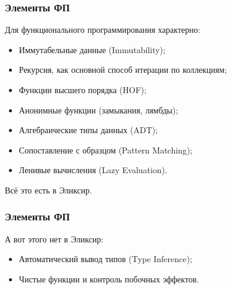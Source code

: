 \documentclass[10pt]{beamer}
\begin{document}
\begin{frame}
  \frametitle{Элементы ФП}
  Для функционального программирования характерно:
  \par \bigskip
  \begin{itemize}
  \item Иммутабельные данные (Immutability);
  \item Рекурсия, как основной способ итерации по коллекциям;
  \item Функции высшего порядка (HOF);
  \item Анонимные функции (замыкания, лямбды);
  \item Алгебраические типы данных (ADT);
  \item Сопоставление с образцом (Pattern Matching);
  \item Ленивые вычисления (Lazy Evaluation).
  \end{itemize}
  \par \bigskip
  Всё это есть в Эликсир.
\end{frame}

\begin{frame}
  \frametitle{Элементы ФП}
  А вот этого нет в Эликсир:
  \par \bigskip
  \begin{itemize}
  \item Автоматический вывод типов (Type Inference);
  \item Чистые функции и контроль побочных эффектов.
  \end{itemize}
\end{frame}
\end{document}
